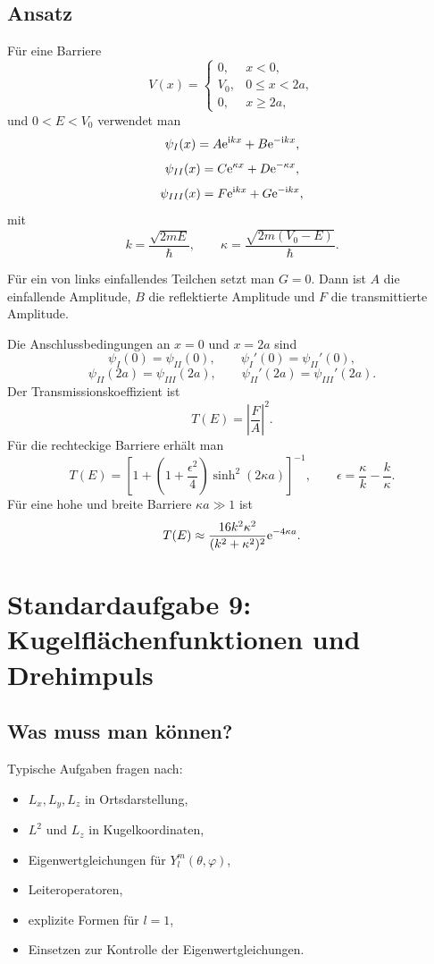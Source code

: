 \subsection{Ansatz}

Für eine Barriere
\[
    V(x)=
    \begin{cases}
        0, & x<0,\\
        V_0, & 0\leq x<2a,\\
        0, & x\geq 2a,
    \end{cases}
\]
und $0<E<V_0$ verwendet man
\[
    \psi_I(x)=A\mathrm{e}^{\mathrm{i} kx}+B\mathrm{e}^{-\mathrm{i} kx},
\]
\[
    \psi_{II}(x)=C\mathrm{e}^{\kappa x}+D\mathrm{e}^{-\kappa x},
\]
\[
    \psi_{III}(x)=F\mathrm{e}^{\mathrm{i} kx}+G\mathrm{e}^{-\mathrm{i} kx},
\]
mit
\[
    k=\frac{\sqrt{2mE}}{\hbar},
    \qquad
    \kappa=\frac{\sqrt{2m(V_0-E)}}{\hbar}.
\]

\begin{examtipbox}
Für ein von links einfallendes Teilchen setzt man $G=0$. Dann ist $A$ die einfallende Amplitude, $B$ die reflektierte Amplitude und $F$ die transmittierte Amplitude.
\end{examtipbox}

Die Anschlussbedingungen an $x=0$ und $x=2a$ sind
\[
    \psi_I(0)=\psi_{II}(0),
    \qquad
    \psi_I'(0)=\psi_{II}'(0),
\]
\[
    \psi_{II}(2a)=\psi_{III}(2a),
    \qquad
    \psi_{II}'(2a)=\psi_{III}'(2a).
\]
Der Transmissionskoeffizient ist
\[
    T(E)=\left|\frac{F}{A}\right|^2.
\]
Für die rechteckige Barriere erhält man
\[
    T(E)=\left[1+\left(1+\frac{\epsilon^2}{4}\right)\sinh^2(2\kappa a)\right]^{-1},
    \qquad
    \epsilon=\frac{\kappa}{k}-\frac{k}{\kappa}.
\]
Für eine hohe und breite Barriere $\kappa a\gg1$ ist
\[
    T(E)\approx
    \frac{16k^2\kappa^2}{(k^2+\kappa^2)^2}\mathrm{e}^{-4\kappa a}.
\]

\section{Standardaufgabe 9: Kugelflächenfunktionen und Drehimpuls}

\subsection{Was muss man können?}

Typische Aufgaben fragen nach:
\begin{itemize}
    \item $L_x,L_y,L_z$ in Ortsdarstellung,
    \item $L^2$ und $L_z$ in Kugelkoordinaten,
    \item Eigenwertgleichungen für $Y_l^m(\theta,\varphi)$,
    \item Leiteroperatoren,
    \item explizite Formen für $l=1$,
    \item Einsetzen zur Kontrolle der Eigenwertgleichungen.
\end{itemize}

